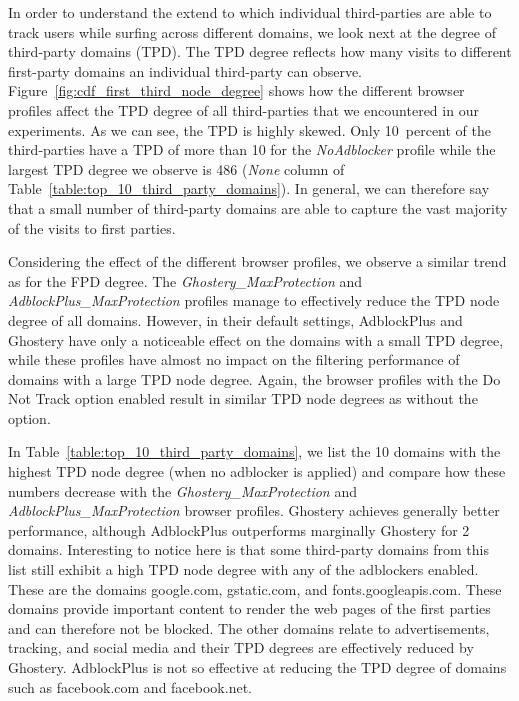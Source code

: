 \documentclass[compsoc, conference, letterpaper, 10pt, times]{IEEEtran}
\begin{document}
In order to understand the extend to which individual third-parties are able to track users while surfing across different domains, we look next at the degree of third-party domains (TPD). The TPD degree reflects how many visits to different first-party domains an individual third-party can observe.  Figure~\ref{fig:cdf_first_third_node_degree} shows how the different browser profiles affect the TPD degree of all third-parties that we encountered in our experiments. As we can see, the TPD is highly skewed. %
Only 10~percent of the third-parties have a TPD of more than 10 for the \textit{NoAdblocker} profile while the largest TPD degree we observe is 486 (\textit{None} column of Table~\ref{table:top_10_third_party_domains}).
In general, we can therefore say that a small number of third-party domains are able to capture the vast majority of the visits to first parties.

Considering the effect of the different browser profiles, we observe a similar trend as for the FPD degree. The \textit{Ghostery\_MaxProtection} and \textit{AdblockPlus\_MaxProtection} profiles manage to effectively reduce the TPD node degree of all domains. However, in their default settings, AdblockPlus and Ghostery have only a noticeable effect on the domains with a small TPD degree, while these profiles have almost no impact on the filtering performance of domains with a large TPD node degree. Again, the browser profiles with the Do Not Track option enabled result in similar TPD node degrees as without the option.

In Table~\ref{table:top_10_third_party_domains}, we list the 10 domains with the highest TPD node degree (when no adblocker is applied) and compare how these numbers decrease with the \textit{Ghostery\_MaxProtection} and \textit{AdblockPlus\_MaxProtection} browser profiles. Ghostery achieves generally better performance, although AdblockPlus outperforms marginally Ghostery for 2 domains. Interesting to notice here is that some third-party domains from this list still exhibit a high TPD node degree with any of the adblockers enabled. These are the domains google.com, gstatic.com, and fonts.googleapis.com. These domains provide important content to render the web pages of the first parties and can therefore not be blocked. The other domains relate to advertisements, tracking, and social media and their TPD degrees are effectively reduced by Ghostery. AdblockPlus is not so effective at reducing the TPD degree of domains such as facebook.com and facebook.net.
\end{document}
